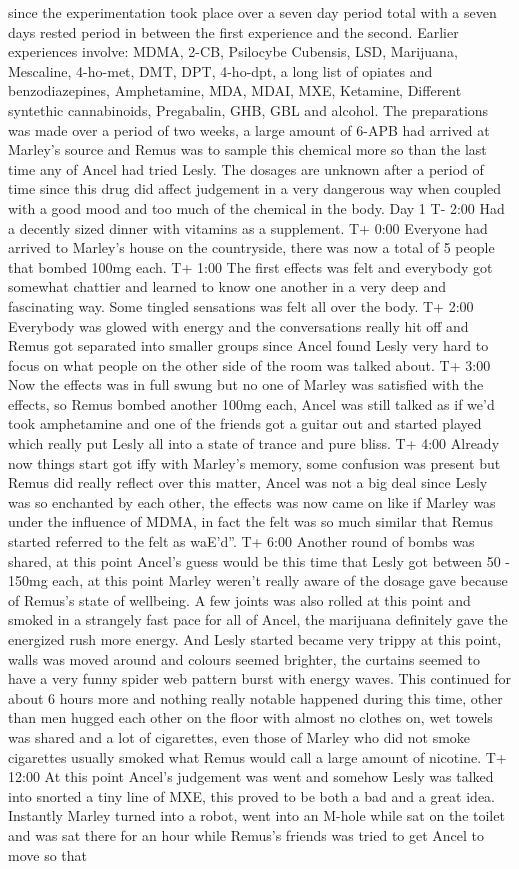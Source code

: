 \documentclass[12pt]{book}
\begin{document}
since the experimentation took place over a seven day period total with a seven days rested period in between the first experience and the second. Earlier experiences involve: MDMA, 2-CB, Psilocybe Cubensis, LSD, Marijuana, Mescaline, 4-ho-met, DMT, DPT, 4-ho-dpt, a long list of opiates and benzodiazepines, Amphetamine, MDA, MDAI, MXE, Ketamine, Different syntethic cannabinoids, Pregabalin, GHB, GBL and alcohol. The preparations was made over a period of two weeks, a large amount of 6-APB had arrived at Marley's source and Remus was to sample this chemical more so than the last time any of Ancel had tried Lesly. The dosages are unknown after a period of time since this drug did affect judgement in a very dangerous way when coupled with a good mood and too much of the chemical in the body. Day 1 T- 2:00 Had a decently sized dinner with vitamins as a supplement. T+ 0:00 Everyone had arrived to Marley's house on the countryside, there was now a total of 5 people that bombed 100mg each. T+ 1:00 The first effects was felt and everybody got somewhat chattier and learned to know one another in a very deep and fascinating way. Some tingled sensations was felt all over the body. T+ 2:00 Everybody was glowed with energy and the conversations really hit off and Remus got separated into smaller groups since Ancel found Lesly very hard to focus on what people on the other side of the room was talked about. T+ 3:00 Now the effects was in full swung but no one of Marley was satisfied with the effects, so Remus bombed another 100mg each, Ancel was still talked as if we'd took amphetamine and one of the friends got a guitar out and started played which really put Lesly all into a state of trance and pure bliss. T+ 4:00 Already now things start got iffy with Marley's memory, some confusion was present but Remus did really reflect over this matter, Ancel was not a big deal since Lesly was so enchanted by each other, the effects was now came on like if Marley was under the influence of MDMA, in fact the felt was so much similar that Remus started referred to the felt as waE'd''. T+ 6:00 Another round of bombs was shared, at this point Ancel's guess would be this time that Lesly got between 50 - 150mg each, at this point Marley weren't really aware of the dosage gave because of Remus's state of wellbeing. A few joints was also rolled at this point and smoked in a strangely fast pace for all of Ancel, the marijuana definitely gave the energized rush more energy. And Lesly started became very trippy at this point, walls was moved around and colours seemed brighter, the curtains seemed to have a very funny spider web pattern burst with energy waves. This continued for about 6 hours more and nothing really notable happened during this time, other than men hugged each other on the floor with almost no clothes on, wet towels was shared and a lot of cigarettes, even those of Marley who did not smoke cigarettes usually smoked what Remus would call a large amount of nicotine. T+ 12:00 At this point Ancel's judgement was went and somehow Lesly was talked into snorted a tiny line of MXE, this proved to be both a bad and a great idea. Instantly Marley turned into a robot, went into an M-hole while sat on the toilet and was sat there for an hour while Remus's friends was tried to get Ancel to move so that 
\end{document}
